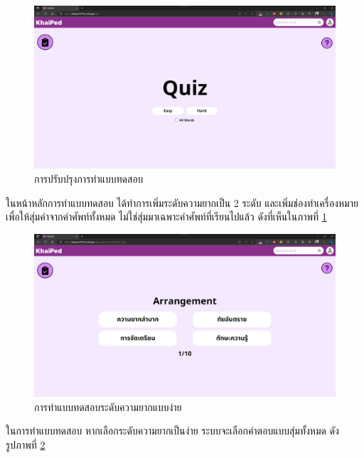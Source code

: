 \documentclass[12pt,oneside,openright,a4paper]{cpe-thai-project}
\begin{document}
\begin{figure}[!h]\centering
	\includegraphics[width=\textwidth, keepaspectratio=true]{image/chap4/Final/quiz.png}
	\caption{{การปรับปรุงการทำแบบทดสอบ}}\label{fig:chap4FinQuiz}
\end{figure}
\hspace{1cm}
ในหน้าหลักการทำแบบทดสอบ ได้ทำการเพิ่มระดับความยากเป็น 2 ระดับ และเพิ่มช่องทำเครื่องหมายเพื่อให้สุ่มคำจากคำศัพท์ทั้งหมด
ไม่ใช่สุ่มมาเฉพาะคำศัพท์ที่เรียนไปแล้ว ดังที่เห็นในภาพที่ \ref{fig:chap4FinQuiz}

\pagebreak
\begin{figure}[!h]\centering
	\includegraphics[width=\textwidth, keepaspectratio=true]{image/chap4/Final/quiz easy.png}
	\caption{{การทำแบบทดสอบระดับความยากแบบง่าย}}\label{fig:chap4FinQuizEasy}
\end{figure}
\hspace{1cm}
ในการทำแบบทดสอบ หากเลือกระดับความยากเป็นง่าย ระบบจะเลือกคำตอบแบบสุ่มทั้งหมด
ดังรูปภาพที่ \ref{fig:chap4FinQuizEasy}
\end{document}
